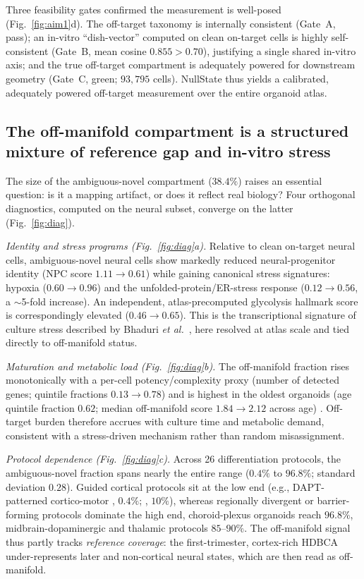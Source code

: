\documentclass[11pt]{article}
\begin{document}
Three feasibility gates confirmed the measurement is well-posed (Fig.~\ref{fig:aim1}d). The off-target
taxonomy is internally consistent (Gate~A, pass); an in-vitro ``dish-vector'' computed on clean
on-target cells is highly self-consistent (Gate~B, mean cosine $0.855>0.70$), justifying a single
shared in-vitro axis; and the true off-target compartment is adequately powered for downstream geometry
(Gate~C, green; $93{,}795$ cells). NullState thus yields a calibrated, adequately powered off-target
measurement over the entire organoid atlas.

\subsection{The off-manifold compartment is a structured mixture of reference gap and in-vitro stress}
The size of the ambiguous-novel compartment ($38.4\%$) raises an essential question: is it a mapping
artifact, or does it reflect real biology? Four orthogonal diagnostics, computed on the neural subset,
converge on the latter (Fig.~\ref{fig:diag}).

\emph{Identity and stress programs (Fig.~\ref{fig:diag}a).} Relative to clean on-target neural cells,
ambiguous-novel neural cells show markedly reduced neural-progenitor identity (NPC score
$1.11\rightarrow0.61$) while gaining canonical stress signatures: hypoxia
($0.60\rightarrow0.96$) \citep{buffa2010hypoxia} and the unfolded-protein/ER-stress response
($0.12\rightarrow0.56$, a $\sim$5-fold increase). An independent, atlas-precomputed glycolysis hallmark
score is correspondingly elevated ($0.46\rightarrow0.65$). This is the transcriptional signature of
culture stress described by Bhaduri \emph{et al.}\ \citep{bhaduri2020stress}, here resolved at atlas
scale and tied directly to off-manifold status.

\emph{Maturation and metabolic load (Fig.~\ref{fig:diag}b).} The off-manifold fraction rises
monotonically with a per-cell potency/complexity proxy (number of detected genes; quintile fractions
$0.13\rightarrow0.78$) and is highest in the oldest organoids (age quintile fraction $0.62$;
median off-manifold score $1.84\rightarrow2.12$ across age) \citep{gulati2020cytotrace}. Off-target
burden therefore accrues with culture time and metabolic demand, consistent with a stress-driven
mechanism rather than random misassignment.

\emph{Protocol dependence (Fig.~\ref{fig:diag}c).} Across 26 differentiation protocols, the
ambiguous-novel fraction spans nearly the entire range ($0.4\%$ to $96.8\%$; standard deviation
$0.28$). Guided cortical protocols sit at the low end (e.g., DAPT-patterned cortico-motor
\citep{andersen2020corticomotor}, $0.4\%$; \citealp{pasca2015cortical}, $10\%$), whereas
regionally divergent or barrier-forming protocols dominate the high end, choroid-plexus organoids
\citep{pellegrini2020csf} reach $96.8\%$, midbrain-dopaminergic \citep{fiorenzano2021midbrain} and
thalamic \citep{xiang2019thalamic} protocols $85$--$90\%$. The off-manifold signal thus partly tracks
\emph{reference coverage}: the first-trimester, cortex-rich HDBCA under-represents later and
non-cortical neural states, which are then read as off-manifold.
\end{document}
